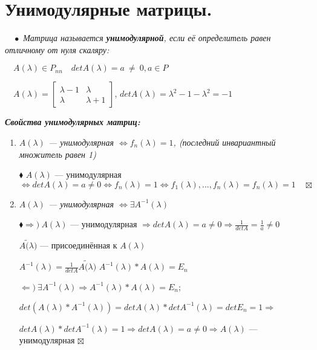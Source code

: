 \documentclass[a4paper, 12pt]{report}
\begin{document}
	
	
	
	\section{Унимодулярные матрицы.}
	$\quad \bullet$ \textit{Матрица называется \textbf{унимодулярной}, если её определитель равен отличному от нуля скаляру:}
	
	$\quad A(\lambda){\in} P_{nn}\quad detA(\lambda) = a\ {\ne}\ 0, a \in P$
	
	
	$\quad A(\lambda) = \begin{bmatrix}
		{\lambda} - 1 & {\lambda}\\
		{\lambda} & {\lambda} + 1
	\end{bmatrix}$, $detA(\lambda) = {\lambda}^2 - 1 - {\lambda}^2 = -1$
	\par\bigskip
	\textit{\textbf{Свойства унимодулярных матриц:}}
	\begin{enumerate}
		\item \textit{$A(\lambda)$ --- унимодулярная $\Longleftrightarrow f_n(\lambda) = 1$, (последний инвариантный множитель равен 1)}
		\par\bigskip
		$\blacklozenge$ $A(\lambda)$ --- унимодулярная $\Longleftrightarrow detA(\lambda) = a \ne 0 \Longleftrightarrow
		f_n(\lambda) = 1 \Longleftrightarrow f_1(\lambda), ...,  f_n(\lambda) = f_n(\lambda) = 1 \quad \boxtimes$
		
		\item \textit{$A(\lambda)$ --- унимодулярная $\Longleftrightarrow \exists A^{-1}(\lambda)$}
		\par\bigskip
		$\blacklozenge \Rightarrow )\ A(\lambda)$ --- унимодулярная $\Longrightarrow detA(\lambda) = a \ne 0 \Longrightarrow \frac 1{detA} = \frac 1a \ne 0$
		
		$A\tilde(\lambda)$ --- присоединённая к $A(\lambda)$
		
		$A^{-1}(\lambda) = \frac 1{detA}A\tilde(\lambda)$ \quad $A^{-1}(\lambda) * A(\lambda) = E_n$
		
		$\Leftarrow)\  \exists A^{-1}(\lambda) \Longrightarrow A^{-1}(\lambda) * A(\lambda) = E_n$;
		
		$det(A(\lambda) * A^{-1}(\lambda)) = detA(\lambda) * detA^{-1}(\lambda) = detE_n = 1 \Longrightarrow$
		
		$detA(\lambda) * detA^{-1}(\lambda) = 1 \Longrightarrow detA(\lambda) = a \ne 0 \Longrightarrow A(\lambda)$ --- унимодулярная \quad $\boxtimes$
	\end{enumerate}
	\par\bigskip
	
\end{document}
